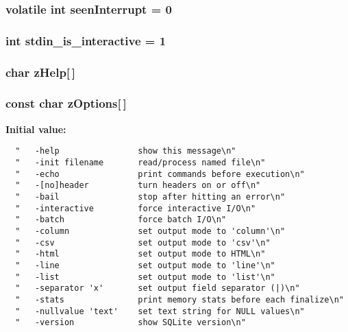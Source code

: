 \subsubsection{\setlength{\rightskip}{0pt plus 5cm}volatile int \bf{seen\-Interrupt} = 0\hspace{0.3cm}{\tt  [static]}}\label{shell_8c_7cbb56b0354cec0829c2ea1fe7a5a3d7}


\subsubsection{\setlength{\rightskip}{0pt plus 5cm}int \bf{stdin\_\-is\_\-interactive} = 1\hspace{0.3cm}{\tt  [static]}}\label{shell_8c_29e4d240d9b9770ed5f9a20b6ad4bda5}


\subsubsection{\setlength{\rightskip}{0pt plus 5cm}char \bf{z\-Help}[$\,$]\hspace{0.3cm}{\tt  [static]}}\label{shell_8c_0300e505aaddc75b284cc62c242bbea6}


\subsubsection{\setlength{\rightskip}{0pt plus 5cm}const char \bf{z\-Options}[$\,$]\hspace{0.3cm}{\tt  [static]}}\label{shell_8c_33eb6a9f186fcc8f1a2ad7b8feda4e48}


\textbf{Initial value:}

\begin{Code}\begin{verbatim} 
  "   -help                show this message\n"
  "   -init filename       read/process named file\n"
  "   -echo                print commands before execution\n"
  "   -[no]header          turn headers on or off\n"
  "   -bail                stop after hitting an error\n"
  "   -interactive         force interactive I/O\n"
  "   -batch               force batch I/O\n"
  "   -column              set output mode to 'column'\n"
  "   -csv                 set output mode to 'csv'\n"
  "   -html                set output mode to HTML\n"
  "   -line                set output mode to 'line'\n"
  "   -list                set output mode to 'list'\n"
  "   -separator 'x'       set output field separator (|)\n"
  "   -stats               print memory stats before each finalize\n"
  "   -nullvalue 'text'    set text string for NULL values\n"
  "   -version             show SQLite version\n"
\end{verbatim}\end{Code}
